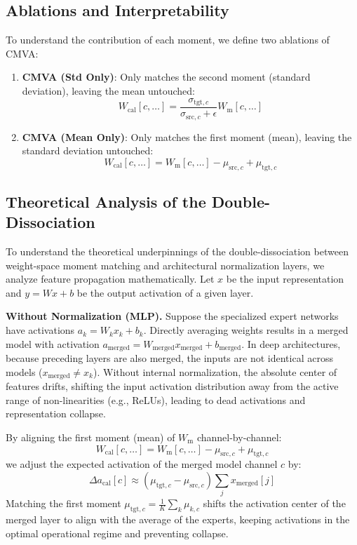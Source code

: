 \documentclass{article}
\theoremstyle{plain}
\theoremstyle{definition}
\theoremstyle{remark}
\begin{document}
\subsection{Ablations and Interpretability}

To understand the contribution of each moment, we define two ablations of CMVA:
\begin{enumerate}
  \item \textbf{CMVA (Std Only)}: Only matches the second moment (standard deviation), leaving the mean untouched:
  \begin{equation}
    W_{\text{cal}}[c, \dots] = \frac{\sigma_{\text{tgt}, c}}{\sigma_{\text{src}, c} + \epsilon} W_{\text{m}}[c, \dots]
  \end{equation}
  \item \textbf{CMVA (Mean Only)}: Only matches the first moment (mean), leaving the standard deviation untouched:
  \begin{equation}
    W_{\text{cal}}[c, \dots] = W_{\text{m}}[c, \dots] - \mu_{\text{src}, c} + \mu_{\text{tgt}, c}
  \end{equation}
\end{enumerate}

\subsection{Theoretical Analysis of the Double-Dissociation}

To understand the theoretical underpinnings of the double-dissociation between weight-space moment matching and architectural normalization layers, we analyze feature propagation mathematically. Let $x$ be the input representation and $y = Wx + b$ be the output activation of a given layer.

\textbf{Without Normalization (MLP).} Suppose the specialized expert networks have activations $a_k = W_k x_k + b_k$. Directly averaging weights results in a merged model with activation $a_{\text{merged}} = W_{\text{merged}} x_{\text{merged}} + b_{\text{merged}}$. In deep architectures, because preceding layers are also merged, the inputs are not identical across models ($x_{\text{merged}} \neq x_k$). Without internal normalization, the absolute center of features drifts, shifting the input activation distribution away from the active range of non-linearities (e.g., ReLUs), leading to dead activations and representation collapse.

By aligning the first moment (mean) of $W_{\text{m}}$ channel-by-channel:
\begin{equation}
  W_{\text{cal}}[c, \dots] = W_{\text{m}}[c, \dots] - \mu_{\text{src}, c} + \mu_{\text{tgt}, c}
\end{equation}
we adjust the expected activation of the merged model channel $c$ by:
\begin{equation}
  \Delta a_{\text{cal}}[c] \approx (\mu_{\text{tgt}, c} - \mu_{\text{src}, c}) \sum_j x_{\text{merged}}[j]
\end{equation}
Matching the first moment $\mu_{\text{tgt}, c} = \frac{1}{K} \sum_k \mu_{k, c}$ shifts the activation center of the merged layer to align with the average of the experts, keeping activations in the optimal operational regime and preventing collapse.
\end{document}
